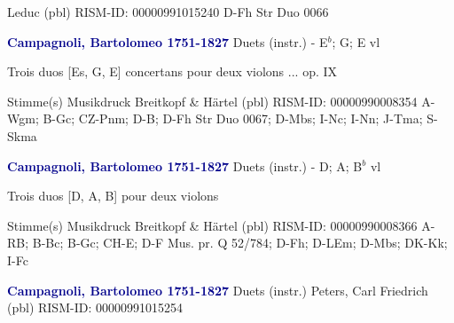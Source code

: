 \documentclass[twocolumn]{book}
\begin{document}
\newline Leduc  (pbl)
\newline RISM-ID: 00000991015240
\newline D-Fh  Str Duo 0066
\newline \par \vspace{7pt} \textcolor{darkblue}{\textbf{Campagnoli, Bartolomeo  1751-1827}}
\newline Duets (instr.) - E$^b$; G; E
 vl
\newline \begin{itshape}Trois duos [Es, G, E] concertans pour deux violons ... op. IX\end{itshape} 
\newline \textcolor{darkblue}{}  Stimme(s)
\newline Musikdruck
\newline Breitkopf \& Härtel  (pbl)
\newline RISM-ID: 00000990008354
\newline A-Wgm; B-Gc; CZ-Pnm; D-B; D-Fh  Str Duo 0067; D-Mbs; I-Nc; I-Nn; J-Tma; S-Skma
\newline \par \vspace{7pt} \textcolor{darkblue}{\textbf{Campagnoli, Bartolomeo  1751-1827}}
\newline Duets (instr.) - D; A; B$^b$
 vl
\newline \begin{itshape}Trois duos [D, A, B] pour deux violons\end{itshape} 
\newline \textcolor{darkblue}{}  Stimme(s)
\newline Musikdruck
\newline Breitkopf \& Härtel  (pbl)
\newline RISM-ID: 00000990008366
\newline A-RB; B-Bc; B-Gc; CH-E; D-F  Mus. pr. Q 52/784; D-Fh; D-LEm; D-Mbs; DK-Kk; I-Fc
\newline \par \vspace{7pt} \textcolor{darkblue}{\textbf{Campagnoli, Bartolomeo  1751-1827}}
\newline Duets (instr.)
\newline Peters, Carl Friedrich  (pbl)
\newline RISM-ID: 00000991015254
\end{document}
